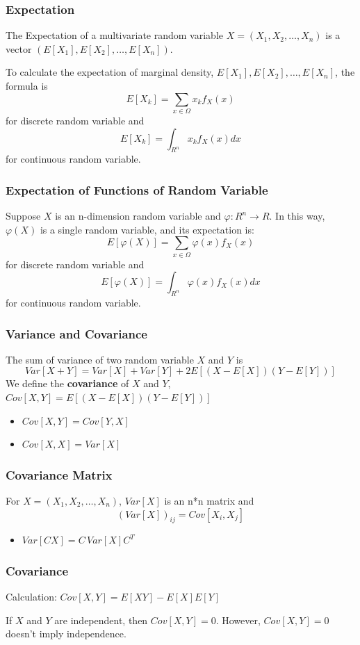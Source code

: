 \documentclass{beamer}
\begin{document}
\begin{frame}
    \frametitle{Expectation}
    The Expectation of a multivariate random variable $X=(X_1, X_2, \dots , X_n)$ is a vector $(E[X_1], E[X_2], \dots , E[X_n])$.\par
    To calculate the expectation of marginal density, $E[X_1], E[X_2], \dots , E[X_n]$, the formula is
    \[E[X_k]=\sum\limits_{x\in \Omega}x_k f_{X}(x)\]
    for discrete random variable and
    \[E[X_k]=\int_{R^n}x_kf_{X}(x)dx\]
    for continuous random variable.


\end{frame}

\begin{frame}
    \frametitle{Expectation of Functions of Random Variable}
    Suppose $X$ is an n-dimension random variable and $\varphi: R^n\rightarrow R$. In this way, $\varphi(X)$ is a single random variable, and its expectation is:
    \[E[\varphi(X)]=\sum\limits_{x\in \Omega}\varphi(x)f_{X}(x)\]
    for discrete random variable and
    \[E[\varphi(X)]=\int_{R^n}\varphi(x)f_{X}(x)dx\]
    for continuous random variable.

\end{frame}

\begin{frame}
    \frametitle{Variance and Covariance}
    The sum of variance of two random variable $X$ and $Y$ is
    \[Var[X+Y]=Var[X]+Var[Y]+2E[(X-E[X])(Y-E[Y])]\]
    We define the \textbf{covariance} of $X$ and $Y$, $Cov[X,Y]=E[(X-E[X])(Y-E[Y])]$
    \begin{itemize}
        \item $Cov[X,Y]=Cov[Y,X]$
        \item $Cov[X,X]=Var[X]$
    \end{itemize}
    

\end{frame}

\begin{frame}
    \frametitle{Covariance Matrix}
    For $X=(X_1, X_2, \dots , X_n)$, $Var[X]$ is an n*n matrix and
    \[(Var[X])_{ij}=Cov[X_i,X_j]\]
    \begin{itemize}
        \item $Var[CX]=C\, Var[X] C^{T}$
    \end{itemize}
    
\end{frame}

\begin{frame}
    \frametitle{Covariance}
    Calculation: $Cov[X,Y]=E[XY]-E[X]E[Y]$\par
    If $X$ and $Y$ are independent, then $Cov[X,Y]=0$. However, $Cov[X,Y]=0$ doesn't imply independence.

\end{frame}
\end{document}
